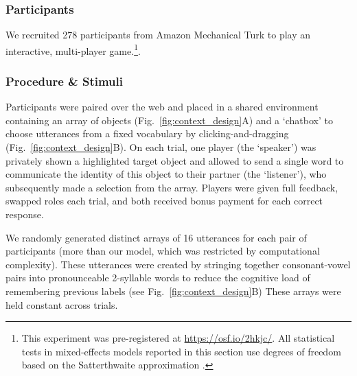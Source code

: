 \subsubsection{Participants}

We recruited 278 participants from Amazon Mechanical Turk to play an interactive, multi-player game.\footnote{This experiment was pre-registered at \url{https://osf.io/2hkjc/}. All statistical tests in mixed-effects models reported in this section use degrees of freedom based on the Satterthwaite approximation \cite{luke2017evaluating}.}.

\subsubsection{Procedure \& Stimuli}
Participants were paired over the web and placed in a shared environment containing an array of objects (Fig.~\ref{fig:context_design}A) and a `chatbox' to choose utterances from a fixed vocabulary by clicking-and-dragging (Fig.~\ref{fig:context_design}B). On each trial, one player (the `speaker') was privately shown a highlighted target object and allowed to send a single word to communicate the identity of this object to their partner (the `listener'), who subsequently made a selection from the array. Players were given full feedback, swapped roles each trial, and both received bonus payment for each correct response.

We randomly generated distinct arrays of 16 utterances for each pair of participants (more than our model, which was restricted by computational complexity).
These utterances were created by stringing together consonant-vowel pairs into pronounceable 2-syllable words to reduce the cognitive load of remembering previous labels (see Fig.~\ref{fig:context_design}B)
These arrays were held constant across trials.

